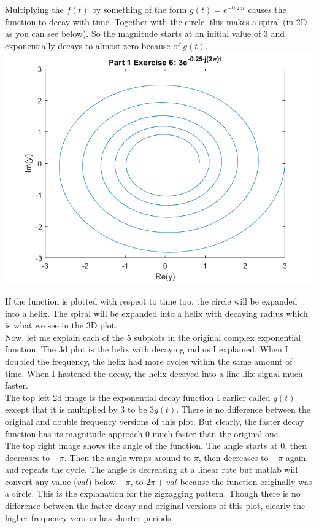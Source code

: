 \documentclass[11pt]{article}
\begin{document}
Multiplying the $f(t)$ by something of the form $g(t) = e^{-0.25t}$ causes the function to decay with time. Together with the circle, this makes a spiral (in 2D as you can see below). So the magnitude starts at an initial value of 3 and exponentially decays to almost zero because of $g(t)$.\\

\includegraphics[width=\textwidth]{Spiral.png}

If the function is plotted with respect to time too, the circle will be expanded into a helix. The spiral will be expanded into a helix with decaying radius which is what we see in the 3D plot.\\

Now, let me explain each of the 5 subplots in the original complex exponential function. The 3d plot is the helix with decaying radius I explained. When I doubled the frequency, the helix had more cycles within the same amount of time. When I hastened the decay, the helix decayed into a line-like signal much faster.\\

The top left 2d image is the exponential decay function I earlier called $g(t)$ except that it is multiplied by 3 to be $3g(t)$. There is no difference between the original and double frequency versions of this plot. But clearly, the faster decay function has its magnitude approach 0 much faster than the original one.\\

The top right image shows the angle of the function. The angle starts at 0, then decreases to $-\pi$. Then the angle wraps around to $\pi$, then decreases to $-\pi$ again and repeats the cycle. The angle is decreasing at a linear rate but matlab will convert any value ($val$) below $-\pi$, to $2\pi + val$ because the function originally was a circle. This is the explanation for the zigzagging pattern. Though there is no difference between the faster decay and original versions of this plot, clearly the higher frequency version has shorter periods.\\
\end{document}
